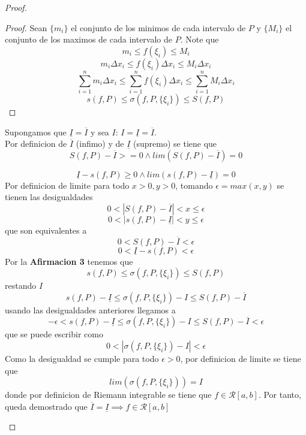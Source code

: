 \documentclass{article}
\begin{document}
\begin{proof}
\begin{enumerate}
\begin{proof}
Sean \(\{m_i\}\) el conjunto de los minimos de cada intervalo de \(P\) y \(\{M_i\}\) el conjunto de los maximos de cada intervalo de \(P\).
Note que 
\[
m_i \leq f(\xi_i) \leq M_i
\]
\[
m_i \Delta x_i \leq f(\xi_i)\Delta x_i \leq M_i\Delta x_i
\] 
\[
\sum_{i = 1}^{n} m_i \Delta x_i \leq \sum_{i = 1}^{n} f(\xi_i)\Delta x_i \leq \sum_{i = 1}^{n} M_i\Delta x_i
\]
\[
s(f, P) \leq \sigma(f, P,\{\xi_i\}) \leq S(f, P)
\]
\end{proof}
Supongamos que  \(\underline{I} = \overline{I}\) y sea \(I\): \(I = \underline{I} = \overline{I}\).\\

Por definicion de \(\overline{I}\) (infimo) y de \(\underline{I}\) (supremo) se tiene que 
\[
S(f, P) - \overline{I} >= 0 \wedge lim (S(f, P) - \overline{I}) = 0
\]

\[
\underline{I} - s(f, P) \geq 0 \wedge lim (s(f, P) - \underline{I}) = 0
\]
Por definicion de limite para todo \(x > 0, y > 0\), tomando \(\epsilon = max(x, y)\) se tienen las desigualdades 
\[
0< |S(f, P) - \overline{I} | < x \leq \epsilon
\]
\[
0< |s(f, P) - \underline{I} | < y \leq \epsilon 
\]
que son equivalentes a
\[
0< S(f, P) - \overline{I}  < \epsilon
\]
\[
0<  \underline{I} -  s(f, P)  < \epsilon
\]
Por la \textbf{Afirmacion 3} tenemos que 
\[
s(f, P) \leq \sigma(f, P,\{\xi_i\}) \leq S(f, P)
\]
restando \(I\)
\[
s(f, P) -\underline{I} \leq \sigma(f, P,\{\xi_i\}) - I \leq S(f, P) - \overline{I}
\]
usando las desigualdades anteriores llegamos a 
\[
-\epsilon < s(f, P) -\underline{I} \leq \sigma(f, P,\{\xi_i\}) - I \leq S(f, P) - \overline{I} < \epsilon
\]
que se puede escribir como
\[
0 <|\sigma(f, P,\{\xi_i\}) - I |< \epsilon
\]
Como la desigualdad se cumple para todo \(\epsilon > 0\), por definicion de limite se tiene que 
\[
lim(\sigma(f, P,\{\xi_i\})) = I
\]
donde por definicion de Riemann integrable se tiene que \(f \in \mathcal{R}[a, b]\). Por tanto, queda demostrado que \( \overline{I} = \underline{I} \implies f \in \mathcal{R}[a, b] \)


\end{enumerate}

\end{proof}
\end{document}
